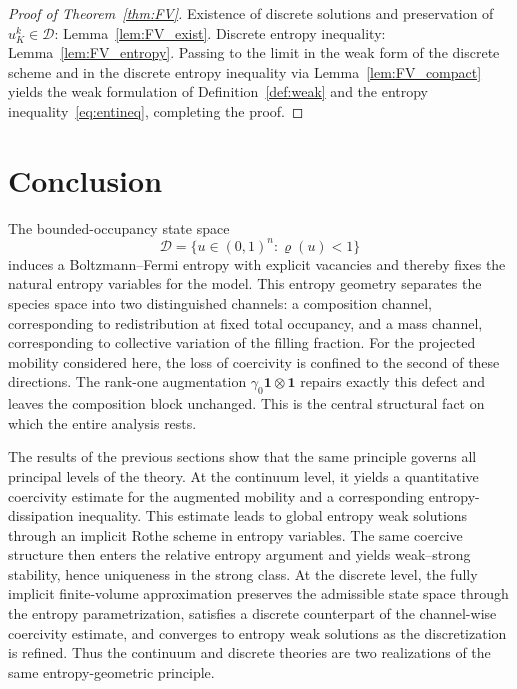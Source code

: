 \documentclass{article}
\newcommand{\bone}{\mathbf{1}}
\newcommand{\D}{\mathcal{D}}
\begin{document}
\begin{proof}[Proof of Theorem~\ref{thm:FV}]
Existence of discrete solutions and preservation of $u^k_K\in\D$:
Lemma~\ref{lem:FV_exist}. Discrete entropy inequality:
Lemma~\ref{lem:FV_entropy}. Passing to the limit in the weak form of the
discrete scheme and in the discrete entropy inequality via
Lemma~\ref{lem:FV_compact} yields the weak formulation of
Definition~\ref{def:weak} and the entropy inequality~\eqref{eq:entineq},
completing the proof.
\end{proof}

\section{Conclusion}
\label{sec:conc}

The bounded-occupancy state space
\[
  \D = \{u\in(0,1)^n : \varrho(u)<1\}
\]
induces a Boltzmann--Fermi entropy with explicit vacancies and thereby
fixes the natural entropy variables for the model. This entropy geometry
separates the species space into two distinguished channels: a
composition channel, corresponding to redistribution at fixed total
occupancy, and a mass channel, corresponding to collective variation of
the filling fraction. For the projected mobility considered here, the
loss of coercivity is confined to the second of these directions.
The rank-one augmentation $\gamma_0\bone\otimes\bone$ repairs exactly
this defect and leaves the composition block unchanged. This is the
central structural fact on which the entire analysis rests.

The results of the previous sections show that the same principle governs
all principal levels of the theory. At the continuum level, it yields a
quantitative coercivity estimate for the augmented mobility and a
corresponding entropy-dissipation inequality. This estimate leads to
global entropy weak solutions through an implicit Rothe scheme in entropy
variables. The same coercive structure then enters the relative entropy
argument and yields weak--strong stability, hence uniqueness in the
strong class. At the discrete level, the fully implicit finite-volume
approximation preserves the admissible state space through the entropy
parametrization, satisfies a discrete counterpart of the channel-wise
coercivity estimate, and converges to entropy weak solutions as the
discretization is refined. Thus the continuum and discrete theories are
two realizations of the same entropy-geometric principle.
\end{document}
